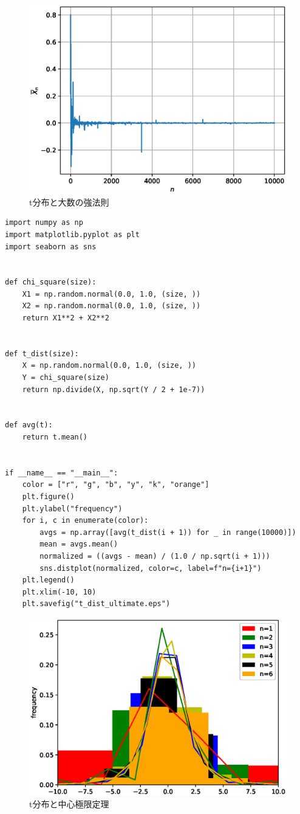 \documentclass[10pt,a4paper]{ltjsarticle}       %
\begin{document}
\begin{figure}[htbp]
\begin{center}
\includegraphics[clip, scale=0.7]{t_dist_strong_law.eps}
\caption{t分布と大数の強法則}
\end{center}
\end{figure}
\clearpage
\begin{lstlisting}
import numpy as np
import matplotlib.pyplot as plt
import seaborn as sns


def chi_square(size):
    X1 = np.random.normal(0.0, 1.0, (size, ))
    X2 = np.random.normal(0.0, 1.0, (size, ))
    return X1**2 + X2**2


def t_dist(size):
    X = np.random.normal(0.0, 1.0, (size, ))
    Y = chi_square(size)
    return np.divide(X, np.sqrt(Y / 2 + 1e-7))


def avg(t):
    return t.mean()


if __name__ == "__main__":
    color = ["r", "g", "b", "y", "k", "orange"]
    plt.figure()
    plt.ylabel("frequency")
    for i, c in enumerate(color):
        avgs = np.array([avg(t_dist(i + 1)) for _ in range(10000)])
        mean = avgs.mean()
        normalized = ((avgs - mean) / (1.0 / np.sqrt(i + 1)))
        sns.distplot(normalized, color=c, label=f"n={i+1}")
    plt.legend()
    plt.xlim(-10, 10)
    plt.savefig("t_dist_ultimate.eps")

\end{lstlisting}

\begin{figure}[htbp]
\begin{center}
\includegraphics[clip, scale=0.7]{t_dist_ultimate.eps}
\caption{t分布と中心極限定理}
\end{center}
\end{figure}
\end{document}
